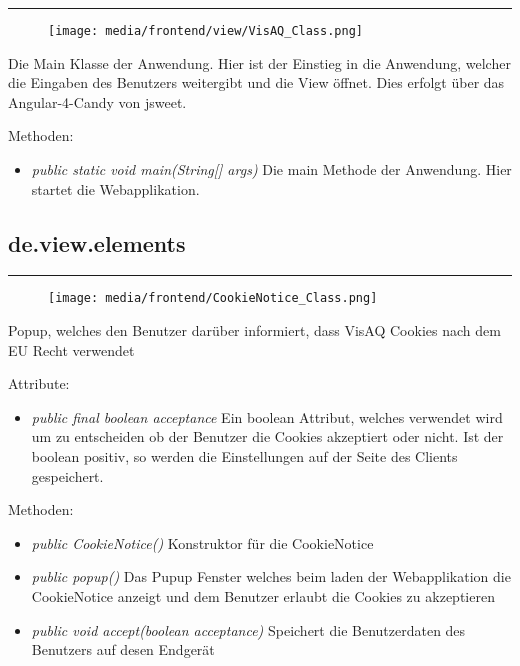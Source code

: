 \rule{\textwidth}{0.4pt} 
\begin{minipage}{0.3\textwidth}
    \begin{figure}[H]
        \texttt{[image: media/frontend/view/VisAQ\_Class.png]}
    \end{figure}
    \end{minipage} \hfill
    \begin{minipage}{0.6\textwidth}
Die Main Klasse der Anwendung. Hier ist der Einstieg in die Anwendung, welcher die Eingaben des Benutzers weitergibt und die View öffnet. Dies erfolgt über das \gls{Angular-4-Candy} von jsweet.
\end{minipage}

Methoden:
\begin{itemize} 
    \item \emph{public static void main(String[] args)} Die main Methode der Anwendung. Hier startet die Webapplikation.
\end{itemize} 

\subsection{de.view.elements}

\rule{\textwidth}{0.4pt} 
\begin{minipage}{0.3\textwidth}
    \begin{figure}[H]
        \texttt{[image: media/frontend/CookieNotice\_Class.png]}
    \end{figure}
    \end{minipage} \hfill
    \begin{minipage}{0.6\textwidth}
Popup, welches den Benutzer darüber informiert, dass VisAQ Cookies nach dem EU Recht verwendet
\end{minipage}

Attribute:
\begin{itemize} 
    \item \emph{public final boolean acceptance} Ein boolean Attribut, welches verwendet wird um zu entscheiden ob der Benutzer die Cookies akzeptiert oder nicht. Ist der boolean positiv, so werden die Einstellungen auf der Seite des Clients gespeichert.
\end{itemize}
Methoden:
\begin{itemize} 
    \item \emph{public CookieNotice()} Konstruktor für die CookieNotice 
    \item \emph{public popup()} Das Pupup Fenster welches beim laden der Webapplikation die CookieNotice anzeigt und dem Benutzer erlaubt die Cookies zu akzeptieren
    \item \emph{public void accept(boolean acceptance)} Speichert die Benutzerdaten des Benutzers auf desen Endgerät
\end{itemize}


